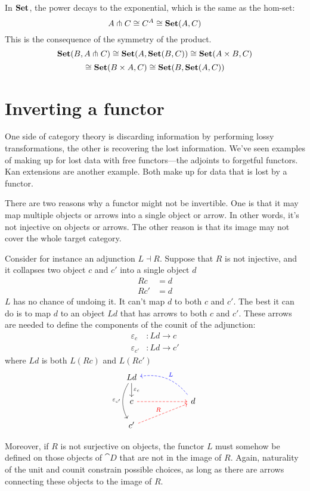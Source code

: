\documentclass[DaoFP]{subfiles}
\begin{document}
In $\mathbf{Set}$, the power decays to the exponential, which is the same as the hom-set:
\[ A \pitchfork C \cong C^A \cong \mathbf{Set} (A, C) \]
This is the consequence of the symmetry of the product.
\[ \mathbf{Set}(B, A \pitchfork C) \cong \mathbf{Set} (A, \mathbf{Set}(B, C)) \cong \mathbf{Set} (A \times B, C) \]
\[ \cong \mathbf{Set} (B \times A, C) \cong \mathbf{Set} (B, \mathbf{Set} (A, C))\]

\section{Inverting a functor}

One side of category theory is discarding information by performing lossy transformations, the other is recovering the lost information. We've seen examples of making up for lost data with free functors---the adjoints to forgetful functors. Kan extensions are another example. Both make up for data that is lost by a functor.

There are two reasons why a functor might not be invertible. One is that it may map multiple objects or arrows into a single object or arrow. In other words, it's not injective on objects or arrows. The other reason is that its image may not cover the whole target category. 

Consider for instance an adjunction $L \dashv R$. Suppose that $R$ is not injective, and it collapses two object $c$ and $c'$ into a single object $d$
\begin{align*}
R c &= d \\
R c' &= d
\end{align*}
$L$ has no chance of undoing it. It can't map $d$ to both $c$ and $c'$. The best it can do is to map $d$ to an object $L d$ that has arrows to both $c$ and $c'$. These arrows are needed to define the components of the counit of the adjunction:
\begin{align*}
\varepsilon_c &\colon L d \to c
\\
\varepsilon_{c'} &\colon L d \to c'
\end{align*}
where $L d$ is both $L (R c)$ and $L (R c')$
\[
 \begin{tikzcd} [row sep=0.5cm, column sep=1cm]
 L d
 \arrow[d, "\varepsilon_c"]
 \arrow[dd, bend right, "\varepsilon_{c'}"']
 \\
 c
 \arrow[rr, red, dashed, ""]
 && d
 \arrow[ull, blue, bend right, dashed, "L"']
 \\
 c'
 \arrow[urr, red, dashed, "R"]
  \end{tikzcd}
\]


Moreover, if $R$ is not surjective on objects, the functor $L$ must somehow be defined on those objects of $\cat D$ that are not in the image of $R$. Again, naturality of the unit and counit constrain possible choices, as long as there are arrows connecting these objects to the image of $R$. 
\end{document}
